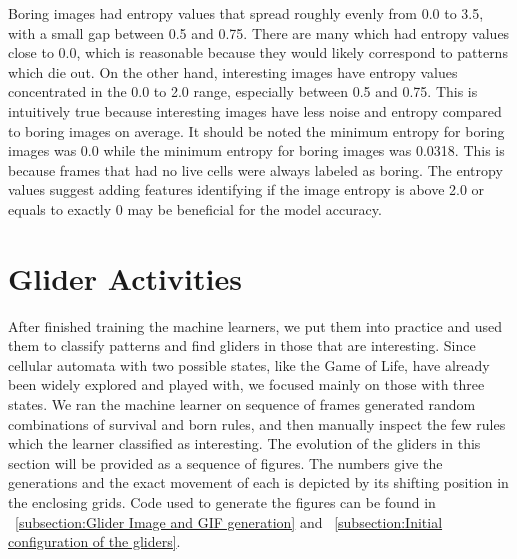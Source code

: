\documentclass[12pt]{article}
\numberwithin{figure}{section} %
\begin{document}
Boring images had entropy values that spread roughly evenly from 0.0 to 3.5, with a small gap between 0.5 and 0.75. There are many which had entropy values close to 0.0, which is reasonable because they would likely correspond to patterns which die out. On the other hand, interesting images have entropy values concentrated in the 0.0 to 2.0 range, especially between 0.5 and 0.75. This is intuitively true because interesting images have less noise and entropy compared to boring images on average. It should be noted the minimum entropy for boring images was 0.0 while the minimum entropy for boring images was 0.0318. This is because frames that had no live cells were always labeled as boring. The entropy values suggest adding features identifying if the image entropy is above 2.0 or equals to exactly 0 may be beneficial for the model accuracy. 

\newpage
\section{Glider Activities}
After finished training the machine learners, we put them into practice and used them to classify patterns and find gliders in those that are interesting. Since cellular automata with two possible states, like the Game of Life, have already been widely explored and played with, we focused mainly on those with three states. We ran the machine learner on sequence of frames generated random combinations of survival and born rules, and then manually inspect the few rules which the learner classified as interesting. The evolution of the gliders in this section will be provided as a sequence of figures. The numbers give the generations and the exact movement of each is depicted by its shifting position in the enclosing grids. Code used to generate the figures can be found in ~\ref{subsection:Glider Image and GIF generation} and ~\ref{subsection:Initial configuration of the gliders}. 
\end{document}
